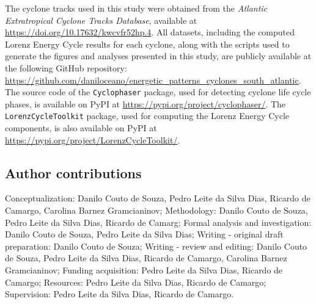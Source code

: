 \documentclass[pdflatex,sn-chicago]{sn-jnl}%
\theoremstyle{plain}
\theoremstyle{definition}
\theoremstyle{remark}
\theoremstyle{definition}
\begin{document}
The cyclone tracks used in this study were obtained from the \textit{Atlantic Extratropical Cyclone Tracks Database}, available at \url{https://doi.org/10.17632/kwcvfr52hp.4}. All datasets, including the computed Lorenz Energy Cycle results for each cyclone, along with the scripts used to generate the figures and analyses presented in this study, are publicly available at the following GitHub repository: \url{https://github.com/daniloceano/energetic_patterns_cyclones_south_atlantic}. The source code of the \texttt{Cyclophaser} package, used for detecting cyclone life cycle phases, is available on PyPI at \url{https://pypi.org/project/cyclophaser/}. The \texttt{LorenzCycleToolkit} package, used for computing the Lorenz Energy Cycle components, is also available on PyPI at \url{https://pypi.org/project/LorenzCycleToolkit/}.

\subsection*{Author contributions}

Conceptualization: Danilo Couto de Souza, Pedro Leite da Silva Dias, Ricardo de Camargo, Carolina Barnez Gramcianinov; Methodology: Danilo Couto de Souza, Pedro Leite da Silva Dias, Ricardo de Camarg; Formal analysis and investigation: Danilo Couto de Souza, Pedro Leite da Silva Dias; Writing - original draft preparation: Danilo Couto de Souza; Writing - review and editing: Danilo Couto de Souza, Pedro Leite da Silva Dias, Ricardo de Camargo, Carolina Barnez Gramcianinov; Funding acquisition: Pedro Leite da Silva Dias, Ricardo de Camargo; Resources: Pedro Leite da Silva Dias, Ricardo de Camargo; Supervision: Pedro Leite da Silva Dias, Ricardo de Camargo.

\end{document}
